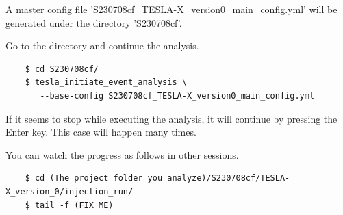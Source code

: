 A master config file 'S230708cf\_TESLA-X\_version0\_main\_config.yml' will be generated under the directory 'S230708cf'.

Go to the directory and continue the analysis.

\begin{verbatim}
    $ cd S230708cf/
    $ tesla_initiate_event_analysis \
       --base-config S230708cf_TESLA-X_version0_main_config.yml
\end{verbatim}

If it seems to stop while executing the analysis, it will continue by pressing the Enter key. This case will happen many times.

You can watch the progress as follows in other sessions.

\begin{verbatim}
    $ cd (The project folder you analyze)/S230708cf/TESLA-X_version_0/injection_run/
    $ tail -f (FIX ME)
\end{verbatim}
